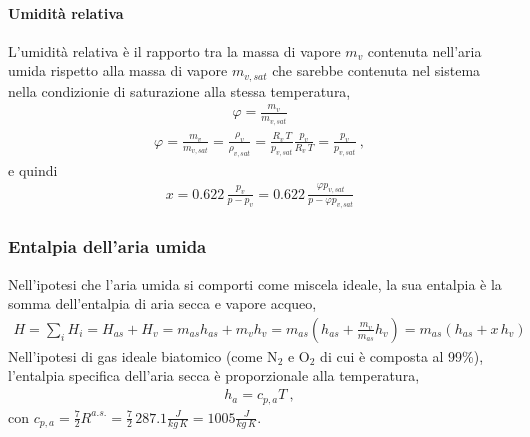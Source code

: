 \documentclass[letterpaper,10pt,italian]{jupyterBook}
\begin{document}
\paragraph{Umidità relativa}
\label{\detokenize{ch/thermodynamics/humid-air:umidita-relativa}}
\sphinxAtStartPar
L’umidità relativa è il rapporto tra la massa di vapore \(m_v\) contenuta nell’aria umida rispetto alla massa di vapore \(m_{v,sat}\) che sarebbe contenuta nel sistema nella condizionie di saturazione alla stessa temperatura,
\begin{equation*}
\begin{split}\varphi = \frac{m_v}{m_{v,sat}}\end{split}
\end{equation*}\begin{equation*}
\begin{split}\varphi = \frac{m_v}{m_{v,sat}} = \frac{\rho_v}{\rho_{v,sat}} = \frac{R_v \, T}{p_{v,sat}} \frac{p_v}{R_v \, T} = \frac{p_v}{p_{v,sat}} \ ,\end{split}
\end{equation*}
\sphinxAtStartPar
e quindi
\begin{equation*}
\begin{split}x = 0.622 \, \frac{p_v}{p - p_v} = 0.622 \, \frac{ \varphi p_{v,sat} }{p - \varphi p_{v,sat}}\end{split}
\end{equation*}

\subsubsection{Entalpia dell’aria umida}
\label{\detokenize{ch/thermodynamics/humid-air:entalpia-dell-aria-umida}}
\sphinxAtStartPar
Nell’ipotesi che l’aria umida si comporti come miscela ideale, la sua entalpia è la somma dell’entalpia di aria secca e vapore acqueo,
\begin{equation*}
\begin{split}H = \sum_i H_i
  = H_{as} + H_v = m_{as} h_{as} + m_v h_v
  = m_{as} \left( h_{as} + \frac{m_v}{m_{as}} h_v \right)
  = m_{as} \left( h_{as} + x \, h_v \right)
\end{split}
\end{equation*}
\sphinxAtStartPar
Nell’ipotesi di gas ideale biatomico (come N\(_2\) e O\(_2\) di cui è composta al 99\%), l’entalpia specifica dell’aria secca è proporzionale alla temperatura,
\begin{equation*}
\begin{split}h_a = c_{p,a} T \ ,\end{split}
\end{equation*}
\sphinxAtStartPar
con \(c_{p,a} = \frac{7}{2} R^{a.s.} = \frac{7}{2} \, 287.1 \frac{J}{kg \, K} = 1005 \frac{J}{kg \, K}\).
\end{document}
